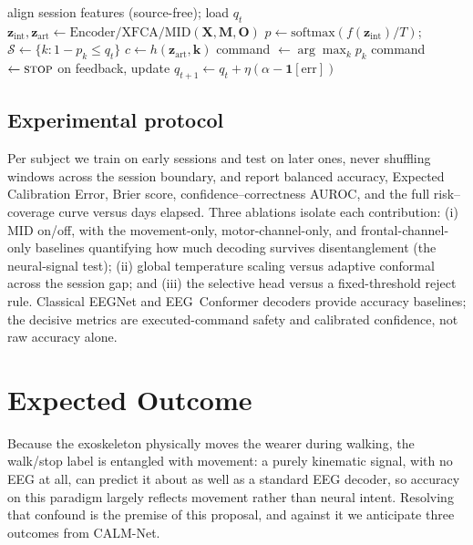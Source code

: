 \documentclass[journal]{IEEEtran}
\begin{document}
\begin{algorithm}[t]
\caption{CALM-Net deployment on session $s$ (per window)}
\label{alg:deploy}
\begin{algorithmic}[1]
\State align session features (source-free); load $q_t$
\State $\mathbf{z}_{\mathrm{int}},\mathbf{z}_{\mathrm{art}}\leftarrow \mathrm{Encoder/XFCA/MID}(\mathbf{X},\mathbf{M},\mathbf{O})$
\State $p\leftarrow \mathrm{softmax}(f(\mathbf{z}_{\mathrm{int}})/T)$;\quad
       $\mathcal{S}\leftarrow\{k:1-p_k\le q_t\}$
\State $c\leftarrow h(\mathbf{z}_{\mathrm{art}},\mathbf{k})$
   \State command $\leftarrow \arg\max_k p_k$
\Else
   \State command $\leftarrow \textsc{stop}$ 
\EndIf
\State on feedback, update $q_{t+1}\leftarrow q_t+\eta(\alpha-\mathbf{1}[\text{err}])$
\end{algorithmic}
\end{algorithm}

\subsection{Experimental protocol}
Per subject we train on early sessions and test on later ones, never shuffling
windows across the session boundary, and report balanced accuracy, Expected
Calibration Error, Brier score, confidence--correctness AUROC, and the full
risk--coverage curve versus days elapsed. Three ablations isolate each contribution:
(i) MID on/off, with the movement-only, motor-channel-only, and frontal-channel-only
baselines quantifying how much decoding survives disentanglement (the neural-signal
test); (ii) global temperature scaling versus adaptive conformal across the session
gap; and (iii) the selective head versus a fixed-threshold reject rule. Classical
EEGNet and EEG~Conformer decoders provide accuracy baselines; the decisive metrics
are executed-command safety and calibrated confidence, not raw accuracy alone.

\section{Expected Outcome}\label{sec:outcome}
Because the exoskeleton physically moves the wearer during walking, the walk/stop
label is entangled with movement: a purely kinematic signal, with no EEG at all, can
predict it about as well as a standard EEG decoder, so accuracy on this paradigm
largely reflects movement rather than neural intent. Resolving that confound is the
premise of this proposal, and against it we anticipate three outcomes from CALM-Net.
\end{document}
